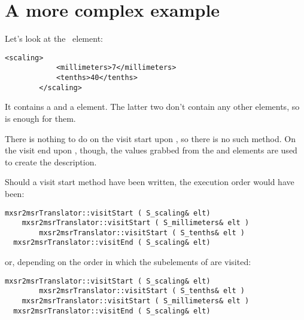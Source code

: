 \section{A more complex example}

Let's look at the  \mxml\ element:
\begin{lstlisting}[language=MusicXML]
		<scaling>
			<millimeters>7</millimeters>
			<tenths>40</tenths>
		</scaling>
\end{lstlisting}

It contains a  and a  element. The latter two don't contain any other elements, so  is enough for them.

There is nothing to do on the visit start upon , so there is no such method.
On the visit end upon , though, the values grabbed from the  and  elements are used to create the  description.

Should a visit start method have been written, the execution order would have been:
\begin{lstlisting}[language=CPlusPlus]
  mxsr2msrTranslator::visitStart ( S_scaling& elt)
  	mxsr2msrTranslator::visitStart ( S_millimeters& elt )
		mxsr2msrTranslator::visitStart ( S_tenths& elt )
  mxsr2msrTranslator::visitEnd ( S_scaling& elt)
\end{lstlisting}

or, depending on the order in which the subelements of  are visited:
\begin{lstlisting}[language=CPlusPlus]
  mxsr2msrTranslator::visitStart ( S_scaling& elt)
		mxsr2msrTranslator::visitStart ( S_tenths& elt )
  	mxsr2msrTranslator::visitStart ( S_millimeters& elt )
  mxsr2msrTranslator::visitEnd ( S_scaling& elt)
\end{lstlisting}

